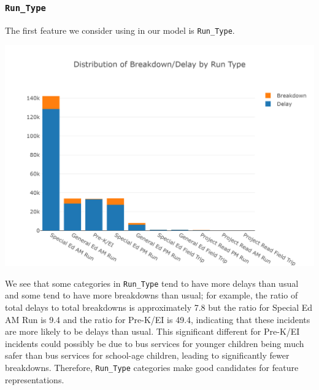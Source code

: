\documentclass[11pt]{article}
\begin{document}
\subsubsection{\texttt{Run\_Type}}
The first feature we consider using in our model is \texttt{Run\_Type}.
\begin{center}
\includegraphics[width=5.25in]{images/run_type_stacked.png}
\end{center}
We see that some categories in \texttt{Run\_Type} tend to have more delays than usual and some tend to have more breakdowns than usual; for example, the ratio of total delays to total breakdowns is approximately 7.8 but the ratio for Special Ed AM Run is 9.4 and the ratio for Pre-K/EI is 49.4, indicating that these incidents are more likely to be delays than usual. This significant different for Pre-K/EI incidents could possibly be due to bus services for younger children being much safer than bus services for school-age children, leading to significantly fewer breakdowns. Therefore, \texttt{Run\_Type} categories make good candidates for feature representations.
\end{document}
